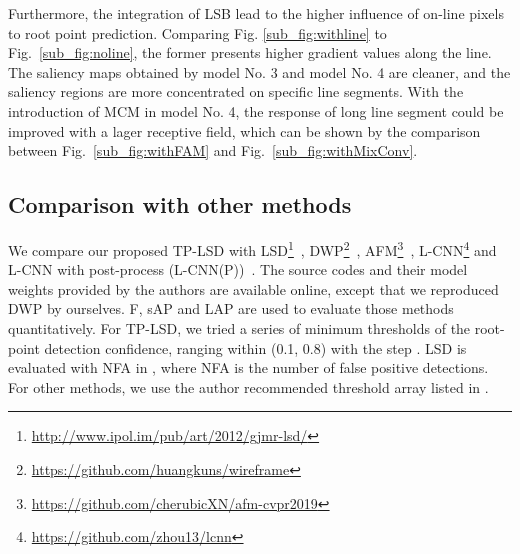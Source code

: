 \documentclass[runningheads]{llncs}
\begin{document}
Furthermore, the integration of LSB lead to the higher influence of on-line pixels to root point prediction. Comparing Fig. \ref{sub_fig:withline} to Fig.~\ref{sub_fig:noline}, the former presents higher gradient values along the line. The saliency maps obtained by model No. 3 and model No. 4 are cleaner, and the saliency regions are more concentrated on specific line segments. With the introduction of MCM in model No. 4, the response of long line segment could be improved with a lager receptive field, which can be shown by the comparison between Fig.~\ref{sub_fig:withFAM} and Fig.~\ref{sub_fig:withMixConv}.

\setcounter{footnote}{0}
\subsection{Comparison with other methods}

We compare our proposed TP-LSD with LSD\footnote{\url{http://www.ipol.im/pub/art/2012/gjmr-lsd/}}~\cite{LSD}, DWP\footnote{\url{https://github.com/huangkuns/wireframe}}~\cite{Wireframe}, AFM\footnote{\url{https://github.com/cherubicXN/afm-cvpr2019}}~\cite{AFM}, L-CNN\footnote{\url{https://github.com/zhou13/lcnn}} and L-CNN with post-process (L-CNN(P))~\cite{LCNN}. The source codes and their model weights provided by the authors are available online, except that we reproduced DWP by ourselves. F, sAP and LAP are used to evaluate those methods quantitatively.
For TP-LSD, we tried a series of minimum thresholds of the root-point detection confidence, ranging within (0.1, 0.8) with the step . LSD is evaluated with NFA in , where NFA is the number of false positive detections. For other methods, we use the author recommended threshold array listed in \cite{Wireframe, AFM, LCNN}.
\end{document}
